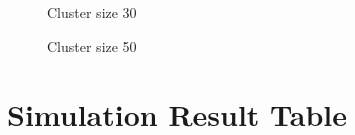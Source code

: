 \documentclass[
  letterpaper,
  DIV=11,
  numbers=noendperiod,
  titlepage]{scrartcl}
\begin{document}
\begin{figure}
\begin{minipage}[t]{0.24\linewidth}
{{}

\caption{Cluster size 30}

}

\end{minipage}%
%
\begin{minipage}[t]{0.24\linewidth}

{\centering 


\caption{Cluster size 50}

}

\end{minipage}%

\end{figure}

\newpage

\recalctypearea
{}

\hypertarget{simulation-result-table}{%
\section{Simulation Result Table}\label{simulation-result-table}}
\end{document}
